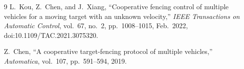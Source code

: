 \begin{thebibliography}{9}
L.~Kou, Z.~Chen, and J.~Xiang,
``Cooperative fencing control of multiple vehicles for a moving target with an unknown velocity,''
\emph{IEEE Transactions on Automatic Control}, vol.~67, no.~2, pp.~1008--1015, Feb.~2022,
doi:10.1109/TAC.2021.3075320.

Z.~Chen,
``A cooperative target-fencing protocol of multiple vehicles,''
\emph{Automatica}, vol.~107, pp.~591--594, 2019.
\end{thebibliography}
